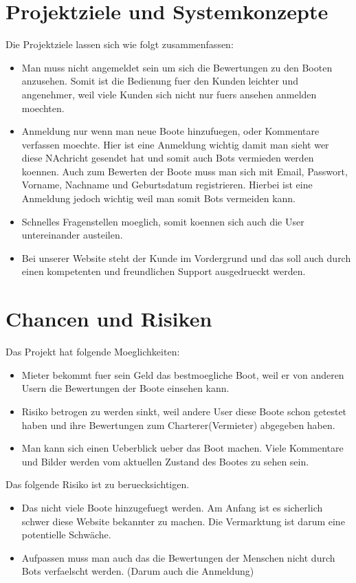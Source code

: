 \documentclass[12pt]{article}
\theoremstyle{definition}
\begin{document}
\pagebreak

\section{Projektziele und Systemkonzepte}
\begin{article}
Die Projektziele lassen sich wie folgt zusammenfassen:
\begin{itemize}
\item Man muss nicht angemeldet sein um sich die Bewertungen zu den Booten anzusehen. Somit ist die Bedienung fuer den Kunden leichter und angenehmer, weil viele Kunden sich nicht nur fuers ansehen anmelden moechten.
\item Anmeldung nur wenn man neue Boote hinzufuegen, oder Kommentare verfassen moechte. Hier ist eine Anmeldung wichtig damit man sieht wer diese NAchricht gesendet hat und somit auch Bots vermieden werden koennen.
Auch zum Bewerten der Boote muss man sich mit Email, Passwort, Vorname, Nachname und Geburtsdatum registrieren.
Hierbei ist eine Anmeldung jedoch wichtig weil man somit Bots vermeiden kann.
\item Schnelles Fragenstellen moeglich, somit koennen sich auch die User untereinander austeilen.
\item Bei unserer Website steht der Kunde im Vordergrund und das soll auch durch einen kompetenten und freundlichen Support ausgedrueckt werden. 
\end{itemize}
\end{article}

\pagebreak
\section{Chancen und Risiken}
\begin{article}
Das Projekt hat folgende Moeglichkeiten:
\begin{itemize}
\item Mieter bekommt fuer sein Geld das bestmoegliche Boot, weil er von anderen Usern die Bewertungen der Boote einsehen kann.
\item Risiko betrogen zu werden sinkt, weil andere User diese Boote schon getestet haben und ihre Bewertungen zum Charterer(Vermieter) abgegeben haben.
\item Man kann sich einen Ueberblick ueber das Boot machen. Viele Kommentare und Bilder werden vom aktuellen Zustand des Bootes zu sehen sein.
\end{itemize}

Das folgende Risiko ist zu beruecksichtigen.
\begin{itemize}
\item Das nicht viele Boote hinzugefuegt werden. Am Anfang ist es sicherlich schwer diese Website bekannter zu machen. Die Vermarktung ist darum eine potentielle Schwäche.
\item Aufpassen muss man auch das die Bewertungen der Menschen nicht durch Bots verfaelscht werden. (Darum auch die Anmeldung)
\end{itemize}

\end{article}
\end{document}
